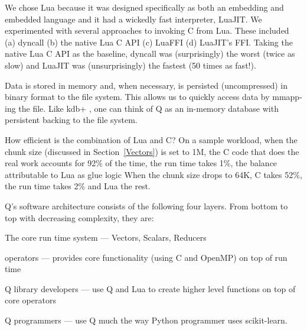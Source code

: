 We chose Lua
because it was designed specifically as both an embedding and embedded language
\cite{Lua2011} and it had a wickedly fast interpreter, LuaJIT.
We experimented with several approaches to invoking C from Lua. These included
(a) dyncall \cite{Adler2013} (b) the native Lua C API (c) LuaFFI (d) LuaJIT's
FFI. Taking the native Lua C API as the baseline, dyncall was (surprisingly) the worst (twice
as slow) and LuaJIT was (unsurprisingly) the fastest (50 times as fast!).

Data is stored in memory and, when necessary, is persisted (uncompressed) in
binary format to the file system. This allows us to quickly access data by
mmapp-ing the file.  Like kdb+ \cite{Borror2015}, one can think of Q as 
an in-memory database with persistent backing to the file system.

How efficient is the combination of Lua and C? 
On a sample workload, when the chunk size 
(discussed in Section~\ref{Vectors})
is set to 1M, the C code that does the real work
accounts for 92\% of the time, the run time takes 1\%, the balance attributable to Lua as glue logic 
When the chunk size drops to 64K, C takes 52\%, the run time takes 2\% and Lua
the rest.

Q's software architecture consists of the following four layers. From bottom to
top with decreasing complexity, they are:
\be
\item The core run time system --- Vectors, Scalars, Reducers
\item operators --- provides core functionality (using C and OpenMP) on
  top of run time
\item Q library developers --- use Q and Lua to create higher level functions on
  top of core operators
\item Q programmers --- use Q much the way  Python programmer uses scikit-learn.
  \ee







% 
